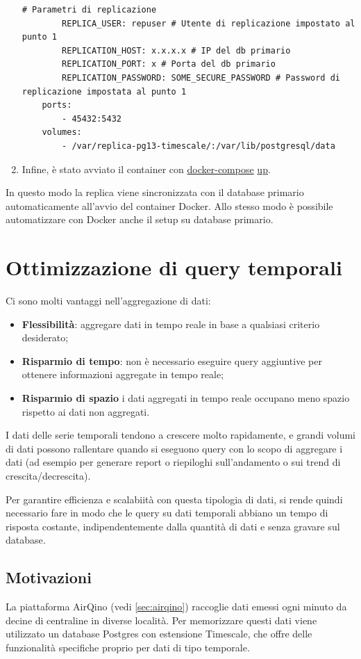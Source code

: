 \begin{enumerate}
\begin{lstlisting}[]
        # Parametri di replicazione
        REPLICA_USER: repuser # Utente di replicazione impostato al punto 1
        REPLICATION_HOST: x.x.x.x # IP del db primario
        REPLICATION_PORT: x # Porta del db primario
        REPLICATION_PASSWORD: SOME_SECURE_PASSWORD # Password di replicazione impostata al punto 1
    ports:
        - 45432:5432
    volumes:
        - /var/replica-pg13-timescale/:/var/lib/postgresql/data
\end{lstlisting}

  \item Infine, è stato avviato il container con \url{docker-compose} \url{up}.
\end{enumerate}

In questo modo la replica viene sincronizzata con il database primario automaticamente all'avvio del container Docker.
Allo stesso modo è possibile automatizzare con Docker anche il setup su database primario.

\section{Ottimizzazione di query temporali}\label{sec:cont-aggr}
Ci sono molti vantaggi nell'aggregazione di dati:
\begin{itemize}
  \item \textbf{Flessibilità}: aggregare dati in tempo reale in base a qualsiasi criterio desiderato;
  \item \textbf{Risparmio di tempo}: non è necessario eseguire query aggiuntive per ottenere informazioni aggregate in tempo reale;
  \item \textbf{Risparmio di spazio} i dati aggregati in tempo reale occupano meno spazio rispetto ai dati non aggregati.
\end{itemize}

I dati delle serie temporali tendono a crescere molto rapidamente, e grandi volumi di dati possono rallentare quando si eseguono query con lo scopo di aggregare i dati (ad esempio per generare report o riepiloghi sull'andamento o sui trend di crescita/decrescita).

Per garantire efficienza e scalabiità con questa tipologia di dati, si rende quindi necessario fare in modo che le query su dati temporali abbiano un tempo di risposta costante, indipendentemente dalla quantità di dati e senza gravare sul database.

\subsection{Motivazioni}\label{ssec:cont-aggr-motivazioni}
La piattaforma AirQino (vedi \ref{sec:airqino}) raccoglie dati emessi ogni minuto da decine di centraline in diverse località. Per memorizzare questi dati viene utilizzato un database Postgres con estensione Timescale, che offre delle funzionalità specifiche proprio per dati di tipo temporale.

